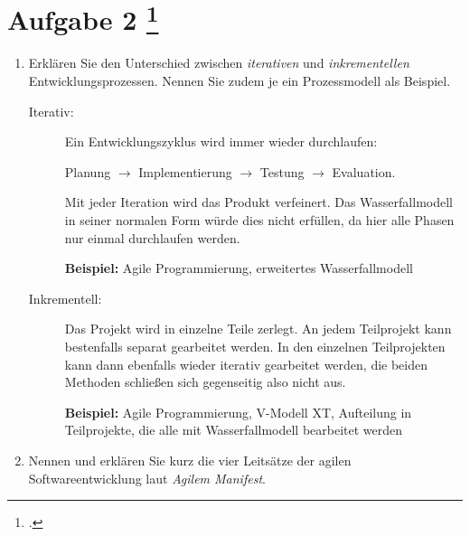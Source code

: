 \documentclass{lehramt-informatik-aufgabe}
\begin{document}
\section{Aufgabe 2
\footcite{66116:2021:03}}

\begin{enumerate}


\item Erklären Sie den Unterschied zwischen \emph{iterativen} und
\emph{inkrementellen} Entwicklungsprozessen. Nennen Sie zudem je ein
Prozessmodell als Beispiel.

\begin{liAntwort}
\begin{description}
\item[Iterativ:]

Ein Entwicklungszyklus wird immer wieder durchlaufen:

\bigskip

Planung $\rightarrow$ Implementierung $\rightarrow$ Testung
$\rightarrow$ Evaluation.

\bigskip

Mit jeder Iteration wird das Produkt verfeinert. Das Wasserfallmodell in
seiner normalen Form würde dies nicht erfüllen, da hier alle Phasen nur
einmal durchlaufen werden.

\bigskip

\textbf{Beispiel:} Agile Programmierung, erweitertes Wasserfallmodell

\item[Inkrementell:]

Das Projekt wird in einzelne Teile zerlegt. An jedem Teilprojekt kann
bestenfalls separat gearbeitet werden. In den einzelnen Teilprojekten
kann dann ebenfalls wieder iterativ gearbeitet werden, die beiden
Methoden schließen sich gegenseitig also nicht aus.

\bigskip

\textbf{Beispiel:} Agile Programmierung, V-Modell XT, Aufteilung in
Teilprojekte, die alle mit Wasserfallmodell bearbeitet werden
\end{description}
\end{liAntwort}


\item Nennen und erklären Sie kurz die vier Leitsätze der agilen
Softwareentwicklung laut \emph{Agilem Manifest}.


\end{enumerate}
\end{document}
